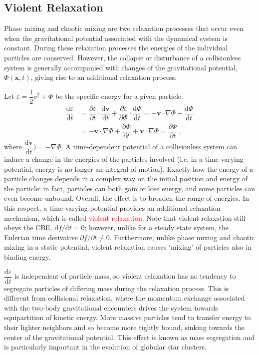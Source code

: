 \documentclass[12pt,a4paper]{article}
\renewcommand{\vec}[1]{\boldsymbol{#1}}
\newcommand{\dif}{\mathrm{d}}
\begin{document}
\subsection{Violent Relaxation}
\cite{2010gfe..book.....M} Phase mixing and chaotic mixing are two relaxation processes that occur even when the gravitational potential associated with the dynamical system is constant. During these relaxation processes the energies of the individual particles are conserved. However, the collapse or disturbance of a collisionless system is generally accompanied with changes of the gravitational potential, $\Phi(\vec{x},t)$, giving rise to an additional relaxation process.

Let $\varepsilon = \dfrac{1}{2} v^2 + \Phi$ be the specific energy for a given particle. 
\begin{align}
\nonumber \dfrac{\dif \varepsilon}{\dif t} &= \dfrac{\partial \varepsilon}{\partial t} \cdot \dfrac{\dif \vec{v}}{\dif t} + \dfrac{\partial \varepsilon}{\partial \Phi} \cdot \dfrac{\dif \Phi}{\dif t} = -\vec{v} \cdot \nabla \Phi + \dfrac{\dif \Phi}{\dif t} \\
&= -\vec{v} \cdot \nabla \Phi + \dfrac{\partial \Phi}{\partial t} + \vec{v} \cdot \nabla \Phi = \dfrac{\partial \Phi}{\partial t} ~,
\end{align}
where $\dfrac{\dif \vec{v}}{\dif t}) = -\nabla \Phi$. A time-dependent potential of a collisionless system can induce a change in the energies of the particles involved (i.e. in a time-varying potential, energy is no longer an integral of motion). Exactly how the energy of a particle changes depends in a complex way on the initial position and energy of the particle: in fact, particles can both gain or lose energy, and some particles can even become unbound. Overall, the effect is to broaden the range of energies. In this respect, a time-varying potential provides an additional relaxation mechanism, which is called \textcolor{red}{violent relaxation}. Note that violent relaxation still obeys the CBE, $\dif f /\dif t = 0$; however, unlike for a steady state system, the Eulerian time derivative $\partial f/\partial t \neq 0$. Furthermore, unlike phase mixing and chaotic mixing in a static potential, violent relaxation causes `mixing' of particles also in binding energy.


$\dfrac{\dif \varepsilon}{\dif t}$ is independent of particle mass, so violent relaxation has no tendency to segregate particles of differing mass during the relaxation process. This is different from collisional relaxation, where the momentum exchange associated with the two-body gravitational encounters drives the system towards equipartition of kinetic energy. More massive particles tend to transfer energy to their lighter neighbors and so become more tightly bound, sinking towards the center of the gravitational potential. This effect is known as mass segregation and is particularly important in the evolution of globular star clusters.
\end{document}
